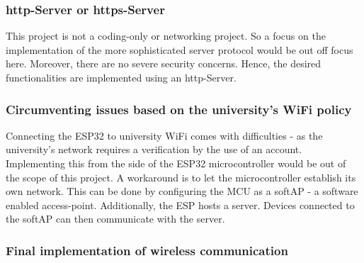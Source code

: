 \documentclass[../report.tex]{subfiles}
\begin{document}
\quad

\subsubsection{http-Server or https-Server}
This project is not a coding-only or networking project. So a focus on the 
implementation of the more sophisticated server protocol would
be out off focus here. Moreover, there are no severe security concerns. Hence, the desired functionalities 
are implemented using an http-Server.

\subsubsection{Circumventing issues based on the university's WiFi policy}

Connecting the ESP32 to university WiFi comes with difficulties - as the 
university's network requires a verification by the use of an account. Implementing this
from the side of the ESP32 microcontroller would be out of the scope of this project.
A workaround is to let the microcontroller establish its own network. This can be 
done by configuring the MCU as a softAP - a software enabled access-point. 
Additionally, the ESP hosts a server. Devices connected to the softAP can then 
communicate with the server.

\subsubsection{Final implementation of wireless communication}
\end{document}
